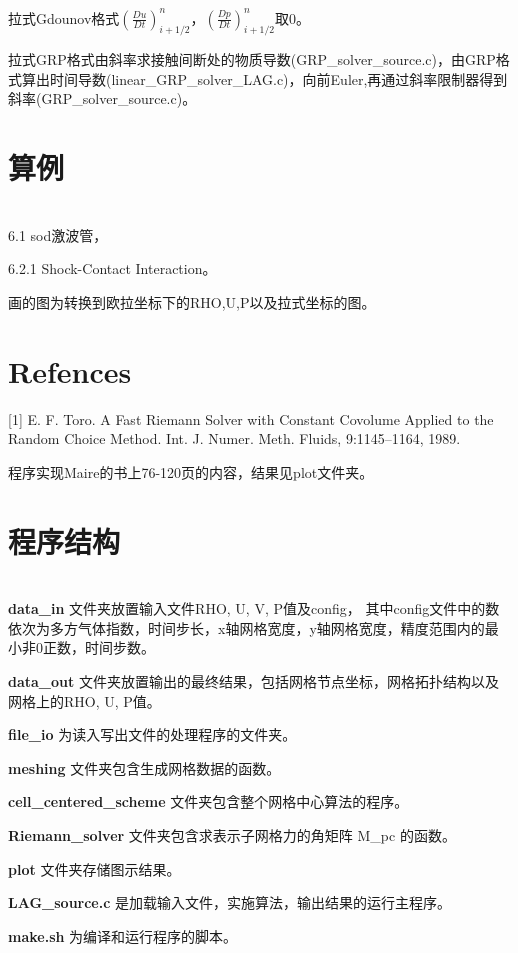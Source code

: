 \documentclass{article}
\begin{document}
拉式Gdounov格式$(\frac{D u}{D t})_{i+1/2}^{n}，(\frac{D p}{D t})_{i+1/2}^{n}$取0。

拉式GRP格式由斜率求接触间断处的物质导数(GRP\_solver\_source.c)，由GRP格式算出时间导数(linear\_GRP\_solver\_LAG.c)，向前Euler,再通过斜率限制器得到斜率(GRP\_solver\_source.c)。

\section{算例}
\ \\

6.1 sod激波管，

6.2.1 Shock-Contact Interaction。

画的图为转换到欧拉坐标下的RHO,U,P以及拉式坐标的图。


\section*{Refences}
[1] E. F. Toro. A Fast Riemann Solver with Constant Covolume Applied to the
Random Choice Method. Int. J. Numer. Meth. Fluids, 9:1145–1164, 1989.

程序实现Maire的书上76-120页的内容，结果见plot文件夹。

\section{程序结构}
\ \\

\textbf{data\_in} 文件夹放置输入文件RHO, U, V, P值及config，
其中config文件中的数依次为多方气体指数，时间步长，x轴网格宽度，y轴网格宽度，精度范围内的最小非0正数，时间步数。

\textbf{data\_out} 文件夹放置输出的最终结果，包括网格节点坐标，网格拓扑结构以及网格上的RHO, U, P值。

\textbf{file\_io} 为读入写出文件的处理程序的文件夹。

\textbf{meshing} 文件夹包含生成网格数据的函数。

\textbf{cell\_centered\_scheme} 文件夹包含整个网格中心算法的程序。

\textbf{Riemann\_solver} 文件夹包含求表示子网格力的角矩阵 M\_pc 的函数。

\textbf{plot} 文件夹存储图示结果。

\textbf{LAG\_source.c} 是加载输入文件，实施算法，输出结果的运行主程序。

\textbf{make.sh} 为编译和运行程序的脚本。

\ \\
\end{document}
